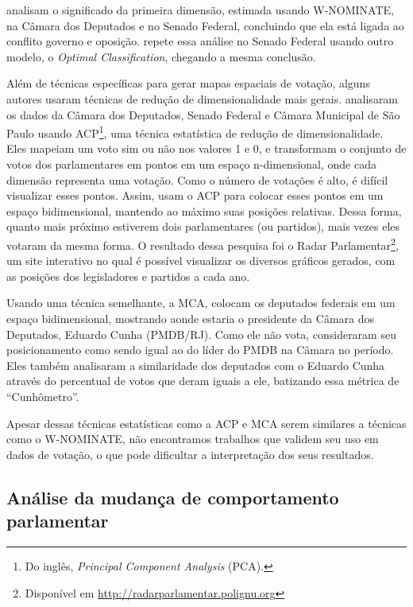  analisam o significado da primeira dimensão, estimada
usando W-NOMINATE, na Câmara dos Deputados e no Senado Federal, concluindo que
ela está ligada ao conflito governo e oposição.  repete
essa análise no Senado Federal usando outro modelo, o \emph{Optimal
Classification}, chegando a mesma conclusão.

Além de técnicas específicas para gerar mapas espaciais de votação, alguns
autores usaram técnicas de redução de dimensionalidade mais gerais.
 analisaram os dados da Câmara dos Deputados, Senado
Federal e Câmara Municipal de São Paulo usando \gls{ACP}\footnote{Do inglês,
\emph{Principal Component Analysis} (PCA).}, uma técnica estatística de redução
de dimensionalidade. Eles mapeiam um voto sim ou não nos valores 1 e 0, e
transformam o conjunto de votos dos parlamentares em pontos em um espaço
n-dimensional, onde cada dimensão representa uma votação. Como o número de
votações é alto, é difícil visualizar esses pontos. Assim, usam o \gls{ACP}
para colocar esses pontos em um espaço bidimensional, mantendo ao máximo suas
posições relativas. Dessa forma, quanto mais próximo estiverem dois
parlamentares (ou partidos), mais vezes eles votaram da mesma forma. O
resultado dessa pesquisa foi o Radar Parlamentar\footnote{Disponível em
\url{http://radarparlamentar.polignu.org}}, um site interativo no qual é
possível visualizar os diversos gráficos gerados, com as posições dos
legisladores e partidos a cada ano.

Usando uma técnica semelhante, a \gls{MCA},  colocam os
deputados federais em um espaço bidimensional, mostrando aonde estaria o
presidente da Câmara dos Deputados, Eduardo Cunha (PMDB/RJ). Como ele não vota,
consideraram seu posicionamento como sendo igual ao do líder do PMDB na Câmara
no período. Eles também analisaram a similaridade dos deputados com o Eduardo
Cunha através do percentual de votos que deram iguais a ele, batizando essa
métrica de ``Cunhômetro''.

Apesar dessas técnicas estatísticas como a \gls{ACP} e \gls{MCA} serem
similares a técnicas como o W-NOMINATE, não encontramos trabalhos que validem
seu uso em dados de votação, o que pode dificultar a interpretação dos seus
resultados.


\subsection{Análise da mudança de comportamento parlamentar}

